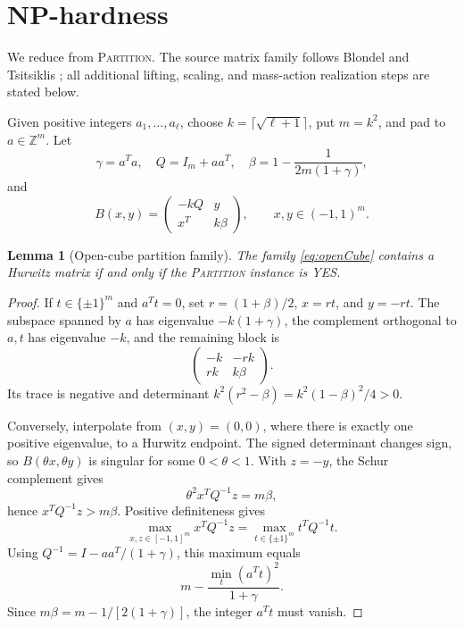 \documentclass[11pt]{article}
\newtheorem{lemma}[theorem]{Lemma}
\theoremstyle{definition}
\begin{document}
\section{NP-hardness}
\label{sec:hardness}

We reduce from \textsc{Partition}.  The source matrix family follows
Blondel and Tsitsiklis \cite{BlondelTsitsiklis1997}; all additional lifting,
scaling, and mass-action realization steps are stated below.

Given positive integers $a_1,\ldots,a_\ell$, choose
$k=\lceil\sqrt{\ell+1}\rceil$, put $m=k^2$, and pad to $a\in\mathbb Z^m$.
Let
\[
 \gamma=a^Ta,
 \quad Q=I_m+aa^T,
 \quad \beta=1-\frac{1}{2m(1+\gamma)},
\]
and
\begin{equation}
 B(x,y)=\begin{pmatrix}-kQ&y\\x^T&k\beta\end{pmatrix},
 \qquad x,y\in(-1,1)^m.
 \label{eq:openCube}
\end{equation}

\begin{lemma}[Open-cube partition family]
\label{lem:openCube}
The family \eqref{eq:openCube} contains a Hurwitz matrix if and only if the
\textsc{Partition} instance is YES.
\end{lemma}

\begin{proof}
If $t\in\{\pm1\}^m$ and $a^Tt=0$, set
$r=(1+\beta)/2$, $x=rt$, and $y=-rt$.  The subspace spanned by $a$ has
eigenvalue $-k(1+\gamma)$, the complement orthogonal to $a,t$ has eigenvalue
$-k$, and the remaining block is
\[
 \begin{pmatrix}-k&-rk\\rk&k\beta\end{pmatrix}.
\]
Its trace is negative and determinant
$k^2(r^2-\beta)=k^2(1-\beta)^2/4>0$.

Conversely, interpolate from $(x,y)=(0,0)$, where there is exactly one positive
eigenvalue, to a Hurwitz endpoint.  The signed determinant changes sign, so
$B(\theta x,\theta y)$ is singular for some $0<\theta<1$.  With $z=-y$, the
Schur complement gives
\[
 \theta^2x^TQ^{-1}z=m\beta,
\]
hence $x^TQ^{-1}z>m\beta$.  Positive definiteness gives
\[
 \max_{x,z\in[-1,1]^m}x^TQ^{-1}z
 =\max_{t\in\{\pm1\}^m}t^TQ^{-1}t.
\]
Using $Q^{-1}=I-aa^T/(1+\gamma)$, this maximum equals
\[
 m-\frac{\min_t(a^Tt)^2}{1+\gamma}.
\]
Since $m\beta=m-1/[2(1+\gamma)]$, the integer $a^Tt$ must vanish.
\end{proof}
\end{document}
